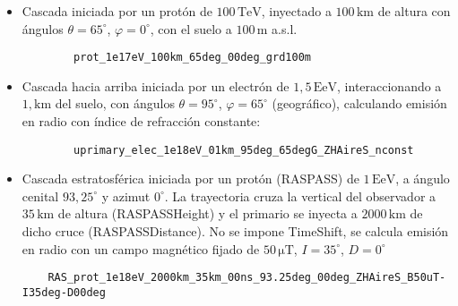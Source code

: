 \documentclass[a4paper,12pt]{article}
\numberwithin{equation}{section}
\numberwithin{figure}{section}
\begin{document}
\begin{itemize}
	\item Cascada iniciada por un protón de $100\,\mathrm{TeV}$, inyectado a $100\,\mathrm{km}$ de altura con ángulos $\theta=65^\circ$, $\varphi=0^\circ$, con el suelo a $100\,\mathrm{m}$ a.s.l.
	\begin{verbatim}
		prot_1e17eV_100km_65deg_00deg_grd100m
	\end{verbatim}
	\item Cascada hacia arriba iniciada por un electrón de $1,5\,\mathrm{EeV}$, interaccionando a $1,\mathrm{km}$ del suelo, con ángulos $\theta = 95^\circ$, $\varphi=65^\circ$ (geográfico), calculando emisión en radio con índice de refracción constante:
	\begin{verbatim}
		uprimary_elec_1e18eV_01km_95deg_65degG_ZHAireS_nconst
	\end{verbatim}
\item Cascada estratosférica iniciada por un protón (RASPASS) de $1\,\mathrm{EeV}$, a ángulo cenital $93,25^\circ$ y azimut $0^\circ$. La trayectoria cruza la vertical del observador a $35\,\mathrm{km}$ de altura (RASPASSHeight) y el primario se inyecta a $2000\,\mathrm{km}$ de dicho cruce (RASPASSDistance). No se impone TimeShift, se calcula emisión en radio con un campo magnético fijado de $50\,\mathrm{\mu T}$, $I=35^\circ$, $D=0^\circ$
\begin{verbatim}
	RAS_prot_1e18eV_2000km_35km_00ns_93.25deg_00deg_ZHAireS_B50uT-I35deg-D00deg
\end{verbatim}
\end{itemize}
\end{document}
